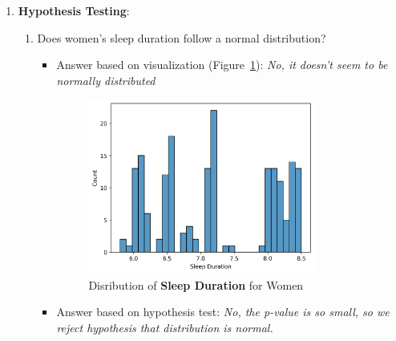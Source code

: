 \documentclass{article}
\begin{document}
\begin{enumerate}
\begin{itemize}
\begin{itemize}
        \end{itemize}
        
    \end{itemize}

    \item \textbf{Hypothesis Testing}:
    \begin{enumerate}[label=(\alph*)]

        \item Does women's sleep duration follow a normal distribution?
        \begin{itemize}
            \item Answer based on visualization (Figure~\ref{fig:Figure_3}):
            \textit{No, it doesn't seem to be normally distributed}
            \begin{figure}[H]  %

                \centering
                \includegraphics[width=0.8\textwidth]{./images/health_distribution_of_sleep_duration_women.png}  %
                \caption{Disribution of \textbf{Sleep Duration} for Women}
                \label{fig:Figure_3}  %
    
            \end{figure}
            
            \item Answer based on hypothesis test:
            \textit{No, the p-value is so small, so we reject hypothesis that distribution is normal.}

        \end{itemize}


\end{enumerate}
\end{enumerate}
\end{document}
